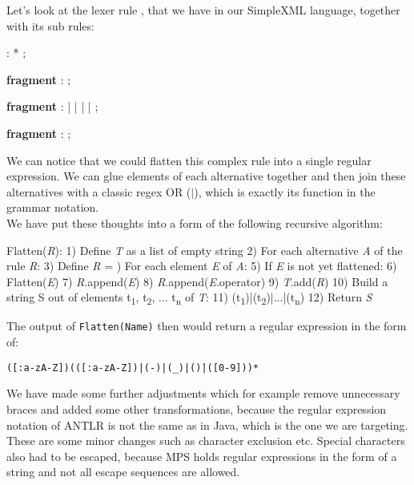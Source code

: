 \pagebreak

Let's look at the lexer rule , that we have in our SimpleXML language, together with its sub rules:

\begin{antlr}
	         :    * ;
	
	\textbf{fragment}
	        :   \regex{[0-9]} ;
	
	\textbf{fragment}
	     :   
	|   \literal{-} | \literal{_} | 
	|   
	;
	
	\textbf{fragment}
	:   \regex{[:a-zA-Z]} ;
\end{antlr}

We can notice that we could flatten this complex rule into a single regular expression. We can glue elements of each alternative together and then join these alternatives with a classic regex OR ($|$), which is exactly its function in the grammar notation.
\\

We have put these thoughts into a form of the following recursive algorithm:    

\begin{antlr}
	Flatten(\textit{R}):
	1) Define \textit{T} as a list of empty string
	2) For each alternative \textit{A} of the rule \textit{R}:
	3)     Define \textit{R} = \ap{})     For each element \textit{E} of \textit{A}:
	5)         If \textit{E} is not yet flattened:
	6)             Flatten(\textit{E})
	7)         \textit{R}.append(\textit{E})
	8)         \textit{R}.append(\textit{E}.operator)
	9)     \textit{T}.add(\textit{R})
	10) Build a string S out of elements t\textsubscript{1}, t\textsubscript{2}, ... t\textsubscript{n} of \textit{T}:
	11)     (t\textsubscript{1})|(t\textsubscript{2})|...|(t\textsubscript{n})
	12) Return \textit{S}
\end{antlr}

The output of \texttt{Flatten(Name)} then would return a regular expression in the form of:

\begin{center}
	\texttt{([:a-zA-Z])(([:a-zA-Z])|(-)|({\_})|(\.)|([0-9]))*}
\end{center}

We have made some further adjustments which for example remove unnecessary braces and added some other transformations, because the regular expression notation of ANTLR is not the same as in Java, which is the one we are targeting. These are some minor changes such as character exclusion etc. Special characters also had to be escaped, because MPS holds regular expressions in the form of a string and not all escape sequences are allowed.

